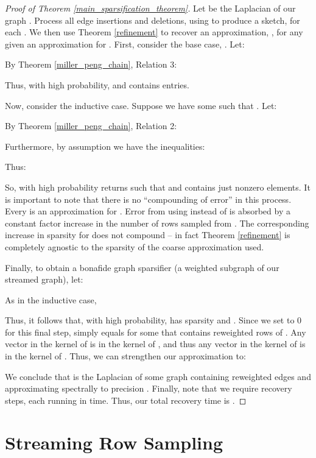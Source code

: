 \documentclass[11pt]{article}
\begin{document}
\begin{proof}[Proof of Theorem \ref{main_sparsification_theorem}]
Let  be the Laplacian of our graph . Process all edge insertions and deletions, using  to produce a sketch,  for each .
We then use Theorem \ref{refinement} to recover an  approximation, , for any   given an  approximation for . First, consider the base case, . Let:

By Theorem \ref{miller_peng_chain}, Relation 3:

Thus, with high probability,  and  contains  entries.

Now, consider the inductive case. Suppose we have some  such that . Let:

By Theorem \ref{miller_peng_chain}, Relation 2:

Furthermore, by assumption we have the inequalities:

Thus:

So, with high probability  returns  such that  and  contains just  nonzero elements. It is important to note that there is no ``compounding of error'' in this process. Every  is an  approximation for . Error from using  instead of  is absorbed by a constant factor increase in the number of rows sampled from . The corresponding increase in sparsity for  does not compound -- in fact Theorem \ref{refinement} is completely agnostic to the sparsity of the coarse approximation  used.

Finally, to obtain a bonafide graph sparsifier (a weighted subgraph of our streamed graph), let:

As in the inductive case,

Thus, it follows that, with high probability,  has sparsity  and . Since we set  to 0 for this final step,  simply equals  for some  that contains reweighted rows of . Any vector in the kernel of  is in the kernel of , and thus any vector in the kernel of  is in the kernel of . Thus, we can strengthen our approximation to:

We conclude that  is the Laplacian of some graph  containing  reweighted edges and approximating  spectrally to precision . Finally, note that we require  recovery steps, each running in  time. Thus, our total recovery time is .
\end{proof}

\section{Streaming Row Sampling}\label{streaming_row_sampling}
\end{document}
